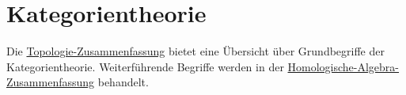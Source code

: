 \documentclass{cheat-sheet}
\begin{document}

\section{Kategorientheorie}

\begin{bem}
  Die \href{http://timbaumann.info/uni-spicker/topo.pdf}{Topologie-Zusammenfassung} bietet eine Übersicht über Grundbegriffe der Kategorientheorie. Weiterführende Begriffe werden in der \href{http://timbaumann.info/uni-spicker/homoalg.pdf}{Homologische-Algebra-Zusammenfassung} behandelt.
\end{bem}

\end{document}

